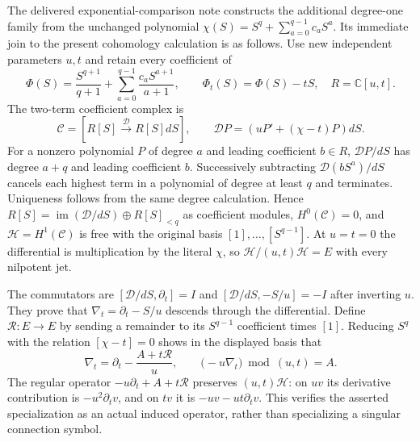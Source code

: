 The delivered exponential-comparison note constructs the additional
degree-one family from the unchanged polynomial
$\chi(S)=S^q+\sum_{a=0}^{q-1}c_aS^a$.  Its immediate join to the
present cohomology calculation is as follows.  Use new independent
parameters $u,t$ and retain every coefficient of
\[
 \Phi(S)=\frac{S^{q+1}}{q+1}
 +\sum_{a=0}^{q-1}\frac{c_aS^{a+1}}{a+1},\qquad
 \Phi_t(S)=\Phi(S)-tS,
 \quad R=\mathbb C[u,t].
 \tag{DS66}
\]
The two-term coefficient complex is
\[
 \mathcal C=[R[S]\xrightarrow{\mathcal D}R[S]dS],
 \qquad\mathcal D P=(uP'+(\chi-t)P)dS.
 \tag{DS67}
\]
For a nonzero polynomial $P$ of degree $a$ and leading coefficient
$b\in R$, $\mathcal DP/dS$ has degree $a+q$ and leading coefficient
$b$.  Successively subtracting $\mathcal D(bS^a)/dS$ cancels each
highest term in a polynomial of degree at least $q$ and terminates.
Uniqueness follows from the same degree calculation.  Hence
$R[S]=\operatorname{im}(\mathcal D/dS)\oplus R[S]_{<q}$ as
coefficient modules, $H^0(\mathcal C)=0$, and
$\mathcal H=H^1(\mathcal C)$ is free with the original basis
$[1],\ldots,[S^{q-1}]$.  At $u=t=0$ the differential is
multiplication by the literal $\chi$, so
$\mathcal H/(u,t)\mathcal H=E$ with every nilpotent jet.

The commutators are
$[\mathcal D/dS,\partial_t]=I$ and
$[\mathcal D/dS,-S/u]=-I$ after inverting $u$.  They prove that
$\nabla_t=\partial_t-S/u$ descends through the differential.
Define $\mathcal R:E\to E$ by sending a remainder to its
$S^{q-1}$ coefficient times $[1]$.  Reducing $S^q$ with the relation
$[\chi-t]=0$ shows in the displayed basis that
\[
 \nabla_t=\partial_t-\frac{A+t\mathcal R}{u},\qquad
 \bigl(-u\nabla_t\bigr)\bmod(u,t)=A.
 \tag{DS68}
\]
The regular operator $-u\partial_t+A+t\mathcal R$ preserves
$(u,t)\mathcal H$: on $uv$ its derivative contribution is
$-u^2\partial_tv$, and on $tv$ it is $-uv-ut\partial_tv$.
This verifies the asserted specialization as an actual induced
operator, rather than specializing a singular connection symbol.

